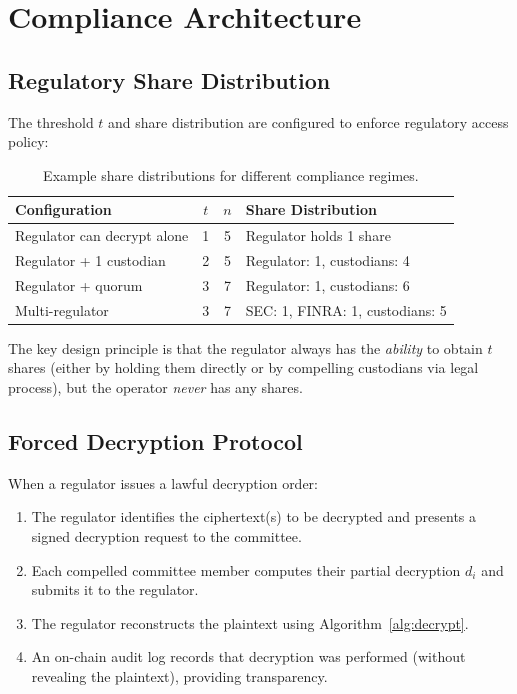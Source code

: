 \documentclass[11pt,a4paper]{article}
\begin{document}
\section{Compliance Architecture}
\label{sec:compliance}

\subsection{Regulatory Share Distribution}

The threshold $t$ and share distribution are configured to enforce
regulatory access policy:

\begin{table}[h]
\centering
\begin{tabular}{lccl}
\toprule
\textbf{Configuration} & $t$ & $n$ & \textbf{Share Distribution} \\
\midrule
Regulator can decrypt alone & 1 & 5 & Regulator holds 1 share \\
Regulator + 1 custodian & 2 & 5 & Regulator: 1, custodians: 4 \\
Regulator + quorum & 3 & 7 & Regulator: 1, custodians: 6 \\
Multi-regulator & 3 & 7 & SEC: 1, FINRA: 1, custodians: 5 \\
\bottomrule
\end{tabular}
\caption{Example share distributions for different compliance regimes.}
\label{tab:share-dist}
\end{table}

The key design principle is that the regulator always has the
\emph{ability} to obtain $t$ shares (either by holding them directly or
by compelling custodians via legal process), but the operator
\emph{never} has any shares.

\subsection{Forced Decryption Protocol}

When a regulator issues a lawful decryption order:

\begin{enumerate}[nosep]
  \item The regulator identifies the ciphertext(s) to be decrypted and
        presents a signed decryption request to the committee.
  \item Each compelled committee member computes their partial decryption
        $d_i$ and submits it to the regulator.
  \item The regulator reconstructs the plaintext using Algorithm~\ref{alg:decrypt}.
  \item An on-chain audit log records that decryption was performed
        (without revealing the plaintext), providing transparency.
\end{enumerate}
\end{document}
